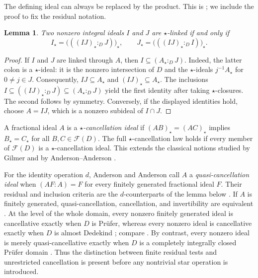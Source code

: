 \documentclass[11pt]{amsart}
\newtheorem{lemma}[lemma]{Lemma}
\theoremstyle{definition}
\theoremstyle{remark}
\newcommand{\Fcal}{\mathcal F}
\begin{document}
The defining ideal can always be replaced by the product.  This is
\cite[Lemma~2.2]{KabbajMimouniStar}; we include the proof to fix the
residual notation.

\begin{lemma}\label{lem:product-linkage}
Two nonzero integral ideals $I$ and $J$ are $\star$-linked if and only if
\begin{equation}\label{eq:product-linkage}
 I_\star=\bigl(((IJ)_\star:_D J)\bigr)_\star,
 \qquad
 J_\star=\bigl(((IJ)_\star:_D I)\bigr)_\star.
\end{equation}
\end{lemma}

\begin{proof}
If $I$ and $J$ are linked through $A$, then
$I\subseteq(A_\star:_D J)$.  Indeed, the latter colon is a
$\star$-ideal: it is the nonzero intersection of $D$ and the
$\star$-ideals $j^{-1}A_\star$ for $0\ne j\in J$.
Consequently, $IJ\subseteq A_\star$ and $(IJ)_\star\subseteq A_\star$.
The inclusions
$I\subseteq((IJ)_\star:_D J)\subseteq(A_\star:_D J)$ yield the first
identity after taking $\star$-closures.  The second follows by symmetry.
Conversely, if the displayed identities hold, choose $A=IJ$, which is a
nonzero subideal of $I\cap J$.
\end{proof}

A fractional ideal $A$ is a \emph{$\star$-cancellation ideal} if
$(AB)_\star=(AC)_\star$ implies $B_\star=C_\star$ for all
$B,C\in\Fcal(D)$.  The full $\star$-cancellation law holds if every member of
$\Fcal(D)$ is a $\star$-cancellation ideal.  This extends the classical
notions studied by Gilmer and by Anderson--Anderson
\cite{AndersonAnderson, GilmerCancellation}.

For the identity operation $d$, Anderson and Anderson call $A$ a
\emph{quasi-cancellation ideal} when $(AF:A)=F$ for every finitely generated
fractional ideal $F$.  Their residual and inclusion criteria are the
$d$-counterparts of the lemma below \cite[Lemma~1]{AndersonAnderson}.  If $A$
is finitely generated, quasi-cancellation, cancellation, and invertibility are
equivalent \cite[Corollary~1 and Theorem~1]{AndersonAnderson}.  At the level
of the whole domain, every nonzero finitely generated ideal is cancellative
exactly when $D$ is Pr\"ufer, whereas every nonzero ideal is cancellative
exactly when $D$ is almost Dedekind
\cite[Theorem~6]{AndersonAnderson}; compare
\cite[Corollary~1 and Theorem~3]{GilmerCancellation}.  By contrast, every
nonzero ideal is merely quasi-cancellative exactly when $D$ is a completely
integrally closed Pr\"ufer domain \cite[Theorem~7]{AndersonAnderson}.  Thus
the distinction between finite residual tests and unrestricted cancellation
is present before any nontrivial star operation is introduced.
\end{document}
